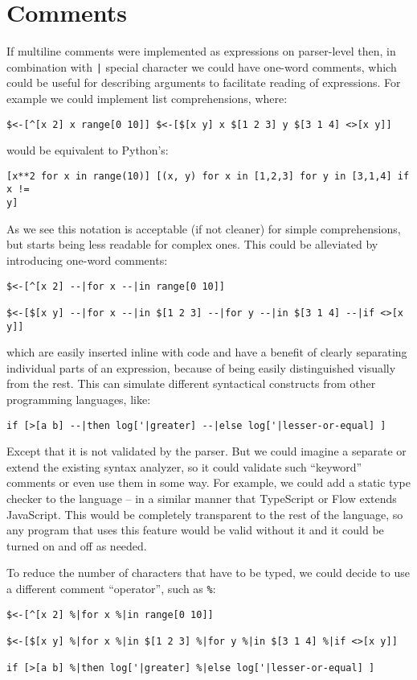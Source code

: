 \section{Comments}\label{sec:comments}
If multiline comments were implemented as expressions on parser-level then, in
combination with \texttt{|} special character we could have one-word comments,
which could be useful for describing arguments to facilitate reading of
expressions. For example we could implement list comprehensions, where:
\begin{lstlisting}
$<-[^[x 2] x range[0 10]] $<-[$[x y] x $[1 2 3] y $[3 1 4] <>[x y]]
\end{lstlisting}
would be equivalent to
Python's\cite[Section~5.1.3]{python_tutorial}:
\begin{lstlisting}
[x**2 for x in range(10)] [(x, y) for x in [1,2,3] for y in [3,1,4] if x !=
y]
\end{lstlisting}
As we see this notation is acceptable (if not cleaner) for simple
comprehensions, but starts being less readable for complex ones. This could be
alleviated by introducing one-word comments:
\begin{lstlisting}
$<-[^[x 2] --|for x --|in range[0 10]]

$<-[$[x y] --|for x --|in $[1 2 3] --|for y --|in $[3 1 4] --|if <>[x y]]
\end{lstlisting}
which are easily inserted inline with code and have a benefit of clearly
separating individual parts of an expression, because of being easily
distinguished visually from the rest. This can simulate different syntactical
constructs from other programming languages, like:
\begin{lstlisting}
if [>[a b] --|then log['|greater] --|else log['|lesser-or-equal] ]
\end{lstlisting}
Except that it is not validated by the parser. But we could imagine a separate
or extend the existing syntax analyzer, so it could validate such ``keyword''
comments or even use them in some way. For example, we could add a static type
checker to the language -- in a similar manner that TypeScript or
Flow\cite{flow_site} extends JavaScript. This would be
completely transparent to the rest of the language, so any program that uses
this feature would be valid without it and it could be turned on and off as
needed.

To reduce the number of characters that have to be typed, we could decide to use
a different comment ``operator'', such as \texttt{\%}:
\begin{lstlisting}
$<-[^[x 2] %|for x %|in range[0 10]]

$<-[$[x y] %|for x %|in $[1 2 3] %|for y %|in $[3 1 4] %|if <>[x y]]

if [>[a b] %|then log['|greater] %|else log['|lesser-or-equal] ]
\end{lstlisting}

